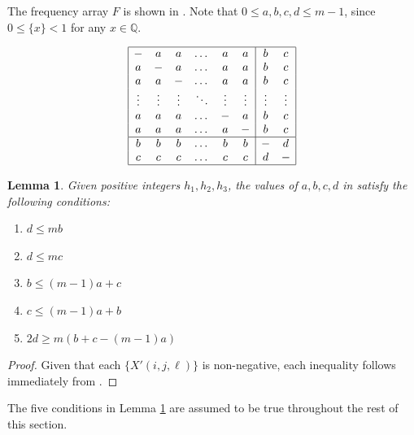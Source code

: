 \documentclass[preprint,nonatbib]{elsarticle}
\newtheorem{lemma}[theorem]{Lemma}
\theoremstyle{definition}
\numberwithin{equation}{section}
\begin{document}
The frequency array $F$ is shown in . Note that $0\leq a,b,c,d\leq m-1$, since $0\leq \{x\}<1$ for any $x\in\mathbb{Q}$.

    \begin{figure}[h]
        \centering
    $$\begin{array}{|cccccc|cc|} \hline
    - & a & a & \dots & a & a & b & c \\
    a & - & a & \dots & a & a & b & c \\
    a & a & - & \dots & a & a & b & c \\
    \vdots & \vdots & \vdots & \ddots & \vdots & \vdots & \vdots & \vdots \\
    a & a & a & \dots & - & a & b & c \\
    a & a & a & \dots & a & - & b & c \\ \hline
    b & b & b & \dots & b & b & - & d \\
    c & c & c & \dots & c & c & d & - \\ \hline
    \end{array}$$
        \caption{}
        \label{fig:abcd array}
    \end{figure}


\begin{lemma}
\label{L fill cond}
    Given positive integers $h_1,h_2,h_3$, the values of $a,b,c,d$ in  satisfy the following conditions:
    \begin{enumerate}[label=\textup{(\arabic*)}]
        \item $d\leq mb$
        \item $d\leq mc$
        \item $b\leq (m-1)a+c$
        \item $c\leq (m-1)a+b$
        \item $2d\geq m(b+c-(m-1)a)$
    \end{enumerate}
\end{lemma}
\begin{proof}
    Given that each $\{X'(i,j,\ell)\}$ is non-negative, each inequality follows immediately from .
\end{proof}

    The five conditions in Lemma \ref{L fill cond} are assumed to be true throughout the rest of this section.
\end{document}
